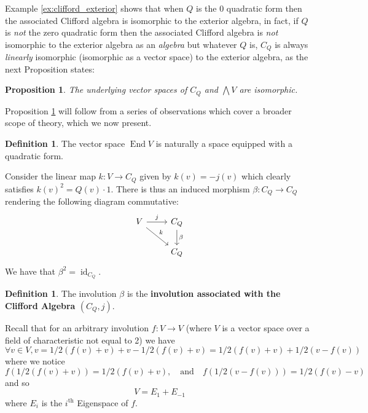 \documentclass[12pt]{article}
\theoremstyle{plain}
\newtheorem{proposition}[thm]{Proposition}
\theoremstyle{definition}
\newtheorem{defn}[thm]{Definition} %
\newcommand{\lto}{\longrightarrow}
\begin{document}
Example \ref{ex:clifford_exterior} shows that when $Q$ is the 0 quadratic form then the associated Clifford algebra is isomorphic to the exterior algebra, in fact, if $Q$ is \emph{not} the zero quadratic form then the associated Clifford algebra is \emph{not} isomorphic to the exterior algebra as an \emph{algebra} but whatever $Q$ is, $C_Q$ is always \emph{linearly} isomorphic (isomorphic as a vector space) to the exterior algebra, as the next Proposition states:
\begin{proposition}\label{prop:linear_iso}
The underlying vector spaces of $C_Q$ and $\bigwedge V$ are isomorphic.
\end{proposition}
Proposition \ref{prop:linear_iso} will follow from a series of observations which cover a broader scope of theory, which we now present.
\begin{defn}
The vector space $\operatorname{End}V$ is naturally a space equipped with a quadratic form.
\end{defn}

Consider the linear map $k: V \lto C_Q$ given by $k(v) = -j(v)$ which clearly satisfies $k(v)^2 = Q(v)\cdot 1$. There is thus an induced morphism $\beta: C_Q \lto C_Q$ rendering the following diagram commutative:
\begin{equation}
\begin{tikzcd}
V\arrow[r,"j"]\arrow[dr,"k"] & C_Q\arrow[d,"\beta"]\\
& C_Q
\end{tikzcd}
\end{equation}
We have that $\beta^2 = \operatorname{id}_{C_Q}$. 

\begin{defn}
The involution $\beta$ is the \textbf{involution associated with the Clifford Algebra $(C_Q,j)$}.
\end{defn}
Recall that for an arbitrary involution $f: V \lto V$ (where $V$ is a vector space over a field of characteristic not equal to 2) we have
\begin{equation}
\forall v \in V, v = 1/2(f(v) + v) + v - 1/2(f(v) + v) = 1/2(f(v) + v) + 1/2(v - f(v))
\end{equation}
where we notice
\begin{equation}
f(1/2(f(v) + v)) = 1/2(f(v) + v),\quad \text{and}\quad f(1/2(v - f(v))) = 1/2(f(v) - v)
\end{equation}
and so
\begin{equation}
V = E_1 + E_{-1}
\end{equation}
where $E_i$ is the $i^\text{th}$ Eigenspace of $f$. 
\end{document}
